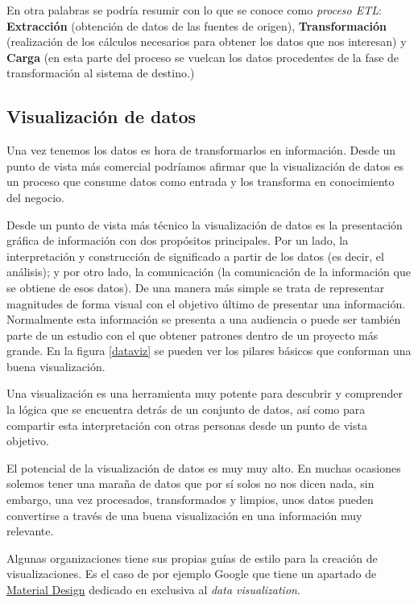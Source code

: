 En otra palabras se podría resumir con lo que se conoce como \textit{proceso ETL}: \textbf{Extracción} (obtención de datos de las fuentes de origen), \textbf{Transformación} (realización de los cálculos necesarios para obtener los datos que nos interesan) y \textbf{Carga} (en esta parte del proceso se vuelcan los datos procedentes de la fase de transformación al sistema de destino.)

\subsection{Visualización de datos}
Una vez tenemos los datos es hora de transformarlos en información. Desde un punto de vista más comercial podríamos afirmar que la visualización de datos es un proceso que consume datos como entrada y los transforma en conocimiento del negocio. 

Desde un punto de vista más técnico la visualización de datos es la presentación gráfica de información con dos propósitos principales. Por un lado, la interpretación y construcción de significado a partir de los datos (es decir, el análisis); y por otro lado, la comunicación (la comunicación de la información que se obtiene de esos datos). De una manera más simple se trata de representar magnitudes de forma visual con el objetivo último de presentar una información. Normalmente esta información se presenta a una audiencia o puede ser también parte de un estudio con el que obtener patrones  dentro de un proyecto más grande.  En la figura \ref{dataviz} se pueden ver los pilares básicos que conforman una buena visualización.


Una  visualización es una herramienta muy potente para descubrir y comprender la lógica que se encuentra detrás de un conjunto de datos, así como para compartir esta interpretación con otras personas desde un punto de vista objetivo.

El potencial de la visualización de datos es muy muy alto. En muchas ocasiones solemos tener una maraña de datos que por sí solos no nos dicen nada, sin embargo, una vez procesados, transformados y limpios, unos datos pueden convertirse a través de una buena visualización en una información muy relevante.

Algunas organizaciones \cite{cesal_what_2019} tiene sus propias guías de estilo para la creación de visualizaciones. Es el caso de por ejemplo Google que tiene un apartado de \href{https://material.io/design/communication/data-visualization.html#types}{Material Design} dedicado en exclusiva al \textit{data visualization}.
